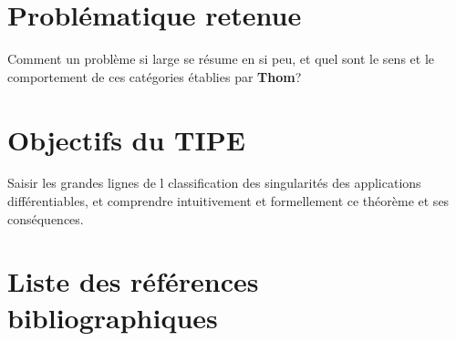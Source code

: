 \documentclass{article}
\begin{document}
\section{Problématique retenue}

Comment un problème si large se résume en si peu, et quel sont le sens et le comportement de ces catégories établies par \textbf{Thom}?

\section{Objectifs du TIPE}

Saisir les grandes lignes de l classification des singularités des applications différentiables, et comprendre intuitivement et formellement ce théorème et ses conséquences.

\section{Liste des références bibliographiques}



\end{document}
